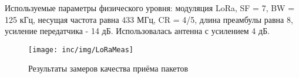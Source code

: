 Используемые параметры физического уровня: модуляция LoRa, SF = 7, BW = 125 
кГц, несущая частота равна 433 МГц, CR = 4/5, длина преамбулы равна 8, усиление 
передатчика - 14 дБ.
Использовалась антенна с усилением 4 дБ.

\begin{figure}[!h]
  \centering
  \texttt{[image: inc/img/LoRaMeas]}
  \caption{Результаты замеров качества приёма пакетов}
  \label{fig:measmap}
\end{figure}